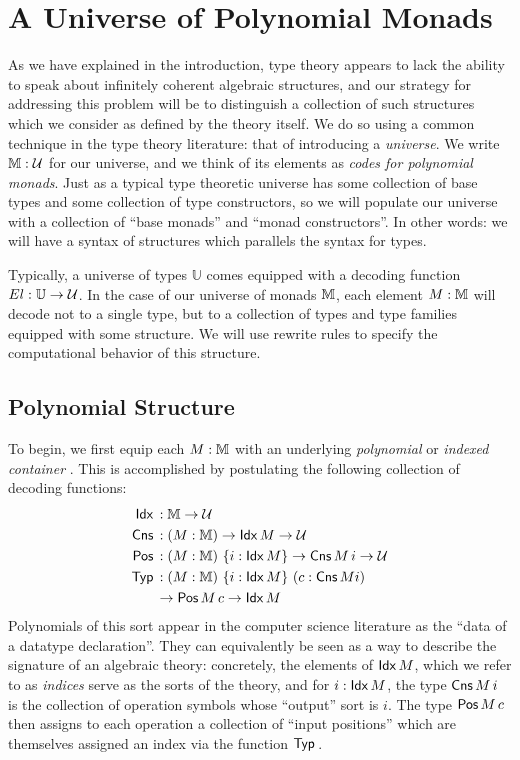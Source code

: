 \section{A Universe of Polynomial Monads}

As we have explained in the introduction, type theory appears to lack
the ability to speak about infinitely coherent algebraic structures,
and our strategy for addressing this problem will be to distinguish a
collection of such structures which we consider as defined by the
theory itself.  We do so using a common technique in the type theory
literature: that of introducing a \emph{universe}.  We write
$\mathbb{M} : \mathcal{U}$ for our universe, and we think of its elements as
\emph{codes for polynomial monads}.  Just as a typical type theoretic
universe has some collection of base types and some collection of type
constructors, so we will populate our universe with a collection of
``base monads'' and ``monad constructors''.  In other words: we
will have a syntax of structures which parallels the syntax for types.

Typically, a universe of types $\mathbb{U}$ comes equipped with a
decoding function $El : \mathbb{U} \to \mathcal{U}$.  In the case of our
universe of monads $\mathbb{M}$, each element $M : \mathbb{M}$ will decode not to a
single type, but to a collection of types and type families equipped
with some structure.  We will use rewrite rules to specify
the computational behavior of this structure.

\subsection{Polynomial Structure}

To begin, we first equip each $M : \mathbb{M}$ with an underlying
\emph{polynomial} or \emph{indexed container} \cite{DBLP:journals/jfp/AltenkirchGHMM15}.
This is accomplished by postulating the following collection of decoding functions:
\begin{align*}
  \mathsf{Idx}\, &: \mathbb{M} \to \mathcal{U}\\
  \mathsf{Cns}\, &: (M : \mathbb{M}) \to \mathsf{Idx}\, M \to \mathcal{U}\\
  \mathsf{Pos}\, &: (M : \mathbb{M})\ \{i : \mathsf{Idx}\, M\} \to \mathsf{Cns}\, M\, i \to \mathcal{U} \\
  \mathsf{Typ}\, &: (M : \mathbb{M})\ \{i : \mathsf{Idx}\, M\}\ (c : \mathsf{Cns}\, M i) \\
       &\to \mathsf{Pos}\, M\, c \to \mathsf{Idx}\, M 
\end{align*}
Polynomials of this sort appear in the computer science literature as
the ``data of a datatype declaration''.  They can equivalently be seen
as a way to describe the signature of an algebraic theory: concretely,
the elements of $\mathsf{Idx}\, M$, which we refer to as \emph{indices} serve as
the sorts of the theory, and for $i : \mathsf{Idx}\, M$, the type $\mathsf{Cns}\, M\, i$
is the collection of operation symbols whose ``output'' sort is $i$.
The type $\mathsf{Pos}\, M\, c$ then assigns to each operation a collection of
``input positions'' which are themselves assigned an index via the
function $\mathsf{Typ}\,$.

